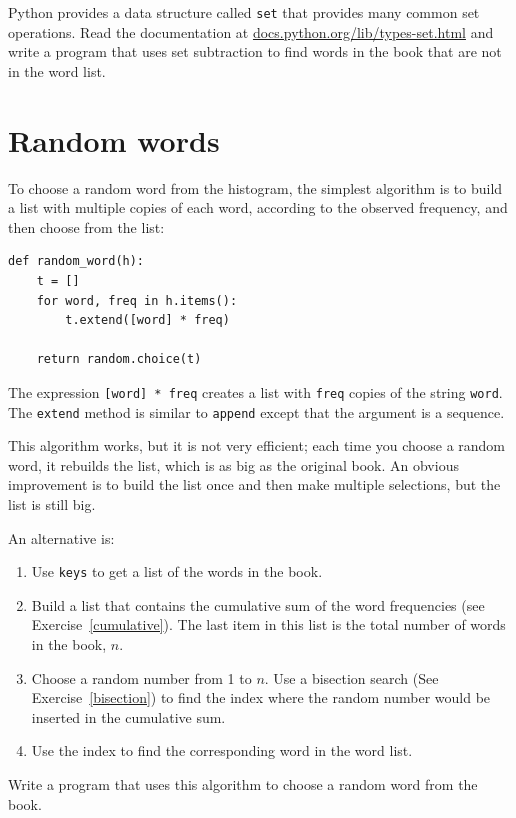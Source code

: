 \begin{ex}


Python provides a data structure called {\tt set} that provides many
common set operations.  Read the documentation at
\url{docs.python.org/lib/types-set.html} and write a program
that uses set subtraction to find words in the book that are not in
the word list.
\end{ex}


\section{Random words}
\label{randomwords}


To choose a random word from the histogram, the simplest algorithm
is to build a list with multiple copies of each word, according
to the observed frequency, and then choose from the list:

\beforeverb
\begin{verbatim}
def random_word(h):
    t = []
    for word, freq in h.items():
        t.extend([word] * freq)

    return random.choice(t)
\end{verbatim}
\afterverb
%
The expression {\tt [word] * freq} creates a list with {\tt freq}
copies of the string {\tt word}.  The {\tt extend}
method is similar to {\tt append} except that the argument is
a sequence.

\begin{ex}
\label{randhist}


This algorithm works, but it is not very efficient; each time you
choose a random word, it rebuilds the list, which is as big as
the original book.  An obvious improvement is to build the list
once and then make multiple selections, but the list is still big.

An alternative is:

\begin{enumerate}

\item Use {\tt keys} to get a list of the words in the book.

\item Build a list that contains the cumulative sum of the word
  frequencies (see Exercise~\ref{cumulative}).  The last item
  in this list is the total number of words in the book, $n$.
  
\item Choose a random number from 1 to $n$.  Use a bisection search
  (See Exercise~\ref{bisection}) to find the index where the random
  number would be inserted in the cumulative sum.

\item Use the index to find the corresponding word in the word list.

\end{enumerate}

Write a program that uses this algorithm to choose a random
word from the book.
\end{ex}




